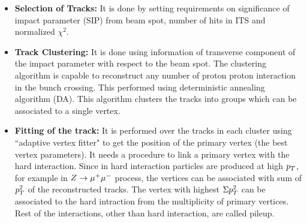 \begin{itemize}
	\item \textbf{Selection of Tracks: } It is done by setting requirements on significance of impact parameter (SIP) from beam spot, number of hits in ITS and normalized $\chi^{2}$.
	\item \textbf{Track Clustering:} It is done using information of transverse component of the impact parameter with respect to the beam spot. The clustering algorithm is capable to reconstruct any number of proton proton interaction in the bunch crossing. This performed using deterministic annealing algorithm (DA). This algorithm clusters the tracks into groups which can be associated to a single vertex. %
	\item \textbf{Fitting of the track:} It is performed over the tracks in each cluster using ``adaptive vertex fitter" to get the position of the primary vertex (the best vertex parameters).
		It needs a procedure to link a primary vertex with the hard interaction. Since in hard interaction particles are produced at high $p_T$, for example in $Z \rightarrow \mathrm{\mu^+\mu^-}$ process, the vertices can be associated with sum of $p_T^{2}$ of the reconstructed tracks. The vertex with highest $\Sigma p_T^{2}$ can be associated to the hard intraction from the multiplicity of primary vertices. Rest of the interactions, other than hard interaction, are called pileup. 
\end{itemize}\\



